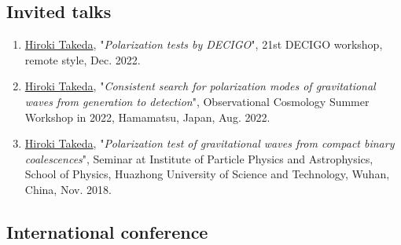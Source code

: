 \documentclass[uplatex, 12pt]{article}
\begin{document}
\subsection*{Invited talks}
\begin{enumerate}
\item \uline{Hiroki Takeda}, "\emph{Polarization tests by DECIGO}", 21st DECIGO workshop, remote style, Dec. 2022.\\

\item \uline{Hiroki Takeda}, "\emph{Consistent search for polarization modes of gravitational waves from generation to detection}", Observational Cosmology Summer Workshop in 2022,  Hamamatsu, Japan, Aug. 2022.\\

\item \uline{Hiroki Takeda}, "\emph{Polarization test of gravitational waves from compact binary coalescences}", Seminar at Institute of Particle Physics and Astrophysics, School of Physics, Huazhong University of Science and Technology, Wuhan, China, Nov. 2018.\\
\end{enumerate}


\subsection*{International conference}
\end{document}

